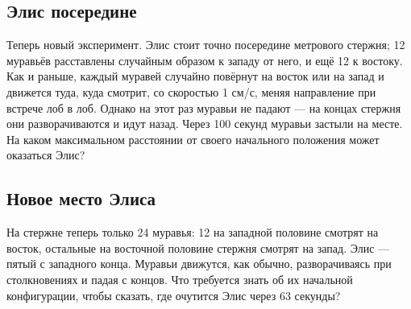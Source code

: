 \subsection*{Элис посередине}

Теперь новый эксперимент.
Элис стоит точно посередине метрового стержня; 12 муравьёв расставлены случайным образом к западу от него, и ещё 12 к востоку.
Как и раньше, каждый муравей случайно повёрнут на восток или на запад и движется туда, куда смотрит, со скоростью 1 см/с, меняя направление при встрече лоб в лоб.
Однако на этот раз муравьи не падают ---
на концах стержня они разворачиваются и идут назад.
Через 100 секунд муравьи застыли на месте.
На каком максимальном расстоянии от своего начального положения может оказаться Элис?

\subsection*{Новое место Элиса}

На стержне теперь только 24 муравья:
12 на западной половине смотрят на восток,
остальные на восточной половине стержня смотрят на запад.
Элис --- пятый с западного конца.
Муравьи движутся, как обычно, разворачиваясь при столкновениях и падая с концов.
Что требуется знать об их начальной конфигурации, чтобы сказать, где очутится Элис через 63 секунды?
